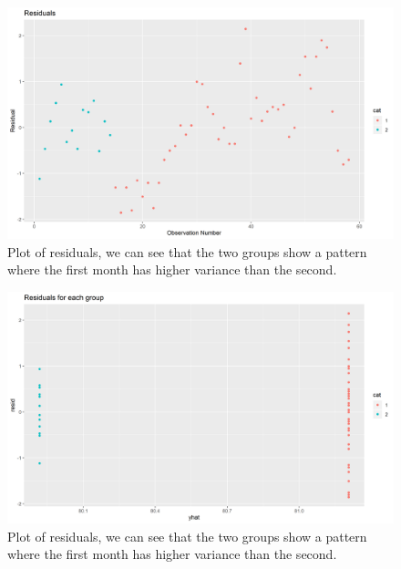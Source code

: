 \documentclass[journal, a4paper]{IEEEtran}
\begin{document}
\begin{figure}[h!]
	\includegraphics[width=\linewidth]{../plots/06_mod1_resid_1.png}
	\caption{Plot of residuals, we can see that the two groups show a pattern where the first month has higher variance than the second.}
	\label{fig:7}
\end{figure}

\begin{figure}[h!]
	\includegraphics[width=\linewidth]{../plots/06_mod1_resid_2.png}
	\caption{Plot of residuals, we can see that the two groups show a pattern where the first month has higher variance than the second.}
	\label{fig:8}
\end{figure}
\end{document}
